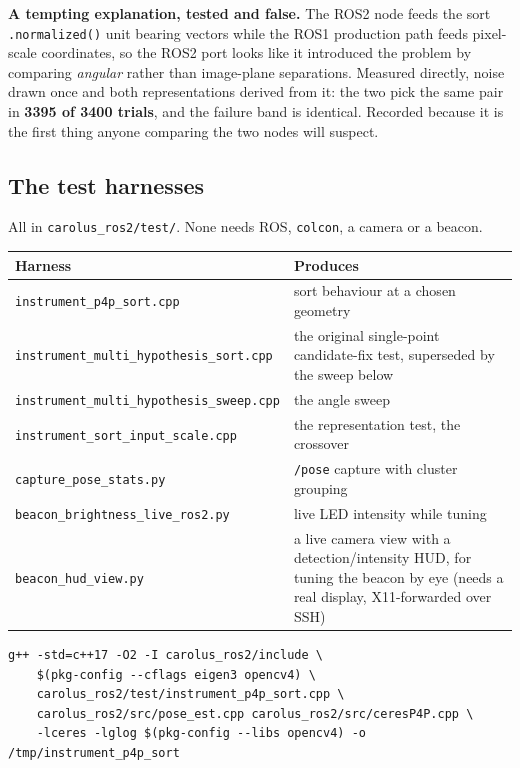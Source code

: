 \documentclass[11pt]{report}
\begin{document}
\textbf{A tempting explanation, tested and false.} The ROS2 node feeds the
sort \texttt{.normalized()} unit bearing vectors while the ROS1 production
path feeds pixel-scale coordinates, so the ROS2 port looks like it
introduced the problem by comparing \emph{angular} rather than image-plane
separations. Measured directly, noise drawn once and both representations
derived from it: the two pick the same pair in \textbf{3395 of 3400
trials}, and the failure band is identical. Recorded because it is the
first thing anyone comparing the two nodes will suspect.

\subsection{The test harnesses}

All in \texttt{carolus\_ros2/test/}. None needs ROS, \texttt{colcon}, a
camera or a beacon.

\begin{center}
\begin{tabular}{@{}ll@{}}
\toprule
Harness & Produces \\
\midrule
\texttt{instrument\_p4p\_sort.cpp} & sort behaviour at a chosen geometry \\
\texttt{instrument\_multi\_hypothesis\_sort.cpp} & the original single-point candidate-fix test, superseded by the sweep below \\
\texttt{instrument\_multi\_hypothesis\_sweep.cpp} & the angle sweep \\
\texttt{instrument\_sort\_input\_scale.cpp} & the representation test, the crossover \\
\texttt{capture\_pose\_stats.py} & \texttt{/pose} capture with cluster grouping \\
\texttt{beacon\_brightness\_live\_ros2.py} & live LED intensity while tuning \\
\texttt{beacon\_hud\_view.py} & a live camera view with a detection/intensity HUD, for tuning the beacon by eye (needs a real display, X11-forwarded over SSH) \\
\bottomrule
\end{tabular}
\end{center}

\begin{lstlisting}[style=shell]
g++ -std=c++17 -O2 -I carolus_ros2/include \
    $(pkg-config --cflags eigen3 opencv4) \
    carolus_ros2/test/instrument_p4p_sort.cpp \
    carolus_ros2/src/pose_est.cpp carolus_ros2/src/ceresP4P.cpp \
    -lceres -lglog $(pkg-config --libs opencv4) -o /tmp/instrument_p4p_sort
\end{lstlisting}
\end{document}
